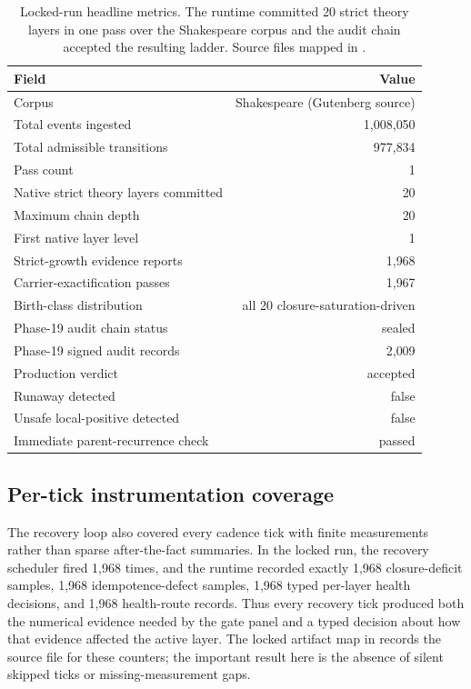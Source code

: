\documentclass{article}
\theoremstyle{definition}
\begin{document}
\begin{table}[t]
  \centering
  \small
  \caption{Locked-run headline metrics. The runtime committed 20 strict theory layers in one pass over the Shakespeare corpus and the audit chain accepted the resulting ladder. Source files mapped in .}
  \label{tab:headline}
  \begin{tabularx}{\linewidth}{@{}>{\raggedright\arraybackslash}X r@{}}
    \toprule
    Field & Value \\
    \midrule
    Corpus & Shakespeare (Gutenberg source) \\
    Total events ingested & 1{,}008{,}050 \\
    Total admissible transitions & 977{,}834 \\
    Pass count & 1 \\
    Native strict theory layers committed & 20 \\
    Maximum chain depth & 20 \\
    First native layer level & 1 \\
    Strict-growth evidence reports & 1{,}968 \\
    Carrier-exactification passes & 1{,}967 \\
    Birth-class distribution & all 20 closure-saturation-driven \\
    Phase-19 audit chain status & sealed \\
    Phase-19 signed audit records & 2{,}009 \\
    Production verdict & accepted \\
    Runaway detected & false \\
    Unsafe local-positive detected & false \\
    Immediate parent-recurrence check & passed \\
    \bottomrule
  \end{tabularx}
\end{table}
 
\subsection{Per-tick instrumentation coverage}\label{subsec:per-tick-instrumentation}

The recovery loop also covered every cadence tick with finite measurements rather than sparse after-the-fact summaries. In the locked run, the recovery scheduler fired 1,968 times, and the runtime recorded exactly 1,968 closure-deficit samples, 1,968 idempotence-defect samples, 1,968 typed per-layer health decisions, and 1,968 health-route records. Thus every recovery tick produced both the numerical evidence needed by the gate panel and a typed decision about how that evidence affected the active layer. The locked artifact map in  records the source file for these counters; the important result here is the absence of silent skipped ticks or missing-measurement gaps.
\end{document}
